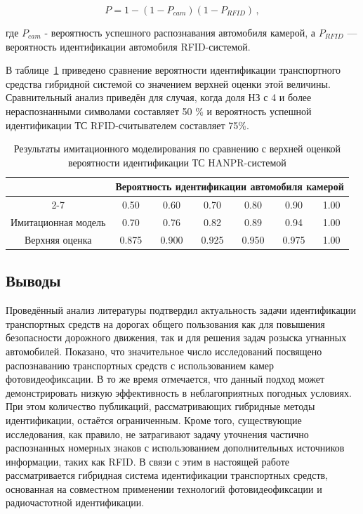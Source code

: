\documentclass[12pt]{article}
\theoremstyle{definition}
\begin{document}
\begin{equation}
    P = 1-(1-P_{cam})(1-P_{RFID})\,,
\label{eq:upper}
\end{equation}

где $P_{cam}$ - вероятность успешного распознавания автомобиля камерой, а $P_{RFID}$ — вероятность идентификации автомобиля RFID-системой.

В таблице~\ref{tab:identification_comparison} приведено сравнение вероятности идентификации транспортного средства гибридной системой со значением верхней оценки этой величины. Сравнительный анализ приведён для случая, когда доля НЗ с 4 и более нераспознанными символами составляет 50 \% и вероятность успешной идентификации ТС RFID-считывателем составляет 75\%.

\begin{table}[h!]
\centering
\begin{tabular}{c|cccccc}
\hline
 & \multicolumn{6}{c}{Вероятность идентификации автомобиля камерой} \\
\cline{2-7}
 & 0.50 & 0.60 & 0.70 & 0.80 & 0.90 & 1.00 \\
\hline

Имитационная модель
& 0.70 & 0.76 & 0.82 & 0.89 & 0.94 & 1.00 \\

Верхняя оценка
& 0.875 & 0.900 & 0.925 & 0.950 & 0.975 & 1.00 \\

\hline
\end{tabular}
\caption{Результаты имитационного моделирования по сравнению с верхней оценкой вероятности идентификации ТС HANPR-системой}
\label{tab:identification_comparison}
\end{table}

\subsection*{Выводы}
Проведённый анализ литературы подтвердил актуальность задачи идентификации транспортных средств на дорогах общего пользования как для повышения безопасности дорожного движения, так и для решения задач розыска угнанных автомобилей. Показано, что значительное число исследований посвящено распознаванию транспортных средств с использованием камер фотовидеофиксации. В то же время отмечается, что данный подход может демонстрировать низкую эффективность в неблагоприятных погодных условиях. При этом количество публикаций, рассматривающих гибридные методы идентификации, остаётся ограниченным. Кроме того, существующие исследования, как правило, не затрагивают задачу уточнения частично распознанных номерных знаков с использованием дополнительных источников информации, таких как RFID. В связи с этим в настоящей работе рассматривается гибридная система идентификации транспортных средств, основанная на совместном применении технологий фотовидеофиксации и радиочастотной идентификации.
\end{document}
